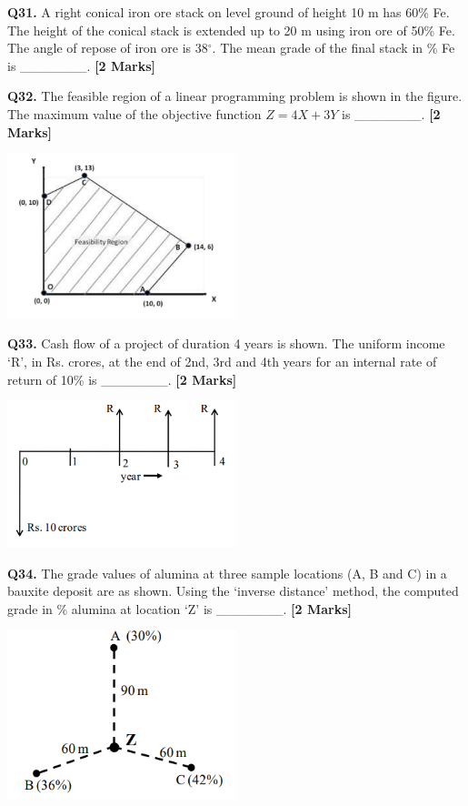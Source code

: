 \documentclass[11pt]{article}
\newcommand{\questionb}[2]{
    \noindent\textbf{Q#2.} #1 \hfill \textbf{[2 Marks]}
}
\begin{document}
\questionb{A right conical iron ore stack on level ground of height 10 m has 60\% Fe. The height of the conical stack is extended up to 20 m using iron ore of 50\% Fe. The angle of repose of iron ore is 38\(^\circ\). The mean grade of the final stack in \% Fe is \_\_\_\_\_\_\_.}{31}
\vspace{0.5cm}

\questionb{The feasible region of a linear programming problem is shown in the figure. The maximum value of the objective function \(Z = 4X + 3Y\) is \_\_\_\_\_\_\_.}{32}
\begin{center}
\includegraphics[width=0.5\textwidth]{figures/32.png}
\end{center}
\vspace{0.5cm}

\questionb{Cash flow of a project of duration 4 years is shown. The uniform income ‘R’, in Rs. crores, at the end of 2nd, 3rd and 4th years for an internal rate of return of 10\% is \_\_\_\_\_\_\_.}{33}
\begin{center}
\includegraphics[width=0.5\textwidth]{figures/33.png}
\end{center}
\vspace{0.5cm}

\questionb{The grade values of alumina at three sample locations (A, B and C) in a bauxite deposit are as shown. Using the ‘inverse distance’ method, the computed grade in \% alumina at location ‘Z’ is \_\_\_\_\_\_\_.}{34}
\begin{center}
\includegraphics[width=0.5\textwidth]{figures/34.png}
\end{center}
\vspace{0.5cm}
\end{document}
